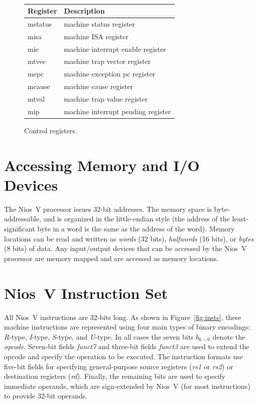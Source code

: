 \documentclass[11pt, twoside, pdftex]{article}
\begin{document}
~~\
\begin{figure}[H]
\begin{center}
\begin{tabular}{|l|l|} \hline 
\rule{0in}{0.1in}{\bf Register} & {\bf Description} \\ \hline
mstatus & machine status register \\
misa & machine ISA register \\
mie & machine interrupt enable register \\
mtvec & machine trap vector register \\
mepc & machine exception pc register \\
mcause & machine cause register \\
mtval & machine trap value register \\
mip & machine interrupt pending register \\ \hline
\end{tabular}
\end{center}
	\caption{Control registers.}
	\label{fig:ctrl_regs}
\end{figure}

\section{Accessing Memory and I/O Devices}

The Nios~V processor issues 32-bit addresses. The memory space is byte-addressable, and is
organized in the little-endian style (the address of the least-significant byte in a word is
the same as the address of the word). 
Memory locations can be read and written as {\it words} (32 bits), {\it halfwords} (16 bits),
or {\it bytes} (8 bits) of data.
Any input/output devices that can be accessed by the
Nios~V processor are memory mapped and are accessed as memory locations. 

\section{Nios~V Instruction Set}

All Nios~V instructions are 32-bits long.  As shown in Figure~\ref{fig:insts}, 
these machine instructions are represented using four main types of binary encodings: 
{\it R}-type, {\it I}-type, {\it S}-type, and {\it U}-type. In all cases the seven 
bits $b_{6-0}$ denote the {\it opcode}. Seven-bit fields {\it funct7} and three-bit fields
{\it funct3} are used to extend the opcode and specify the operation to be executed.
The instruction formats use five-bit fields for specifying general-purpose source registers
({\it rs1} or {\it rs2}) or destination registers ({\it rd}). Finally, the 
remaining bits are used to specify immediate operands, which are sign-extended by Nios~V
(for most instructions) to provide 32-bit operands.
\end{document}
